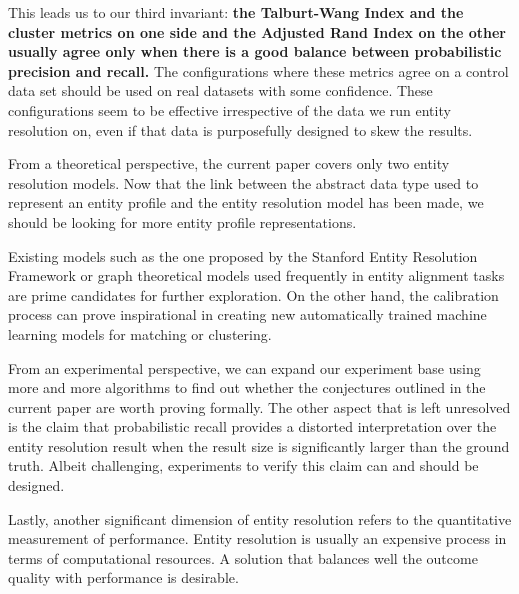 \documentclass[journal]{IEEEtran}
\begin{document}
    This leads us to our third invariant: \textbf{the Talburt-Wang Index and the
    cluster metrics on one side and the Adjusted Rand Index on the other usually
    agree only when there is a good balance between probabilistic precision and
    recall.}
    The configurations where these metrics agree on a control data set should be
    used on real datasets with some confidence.
    These configurations seem to be effective irrespective of the data we run
    entity resolution on, even if that data is purposefully designed to skew the
    results.


    From a theoretical perspective, the current paper covers only two entity
    resolution models.
    Now that the link between the abstract data type used to represent an entity
    profile and the entity resolution model has been made, we should be looking
    for more entity profile representations.

    Existing models such as the one proposed by the Stanford Entity Resolution
    Framework\cite{Ben2009Swoosh} or graph theoretical models used frequently in
    entity alignment tasks are prime candidates for further exploration.
    On the other hand, the calibration process can prove inspirational in
    creating new automatically trained machine learning models for matching or
    clustering.

    From an experimental perspective, we can expand our experiment base using
    more and more algorithms to find out whether the conjectures outlined in
    the current paper are worth proving formally.
    The other aspect that is left unresolved is the claim that probabilistic
    recall provides a distorted interpretation over the entity resolution result
    when the result size is significantly larger than the ground truth.
    Albeit challenging, experiments to verify this claim can and should be
    designed.

    Lastly, another significant dimension of entity resolution refers to the
    quantitative measurement of performance.
    Entity resolution is usually an expensive process in terms of computational
    resources.
    A solution that balances well the outcome quality with performance is
    desirable.

    \balance
    
    
\end{document}
